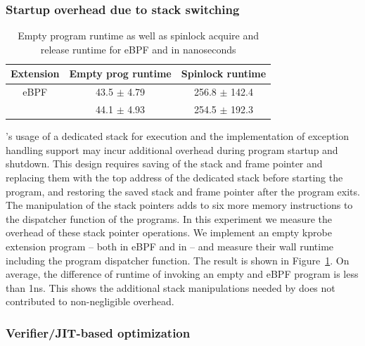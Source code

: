 \subsubsection{Startup overhead due to stack switching}
\begin{table}[t]
    \small
    \centering
    \begin{tabular}{ccc}%
        \toprule
        \textbf{Extension} & \textbf{Empty prog runtime} & \textbf{Spinlock runtime} \\
        \midrule
        eBPF & 43.5 $\pm$ 4.79 & 256.8 $\pm$ 142.4\\
        \projname{} & 44.1 $\pm$ 4.93 & 254.5 $\pm$ 192.3\\
        \bottomrule
    \end{tabular}
    \caption{Empty program runtime as well as spinlock acquire and release
        runtime for eBPF and \projname{} in nanoseconds}
    \vspace{-10pt}
    \label{tab:startup-cleanup}
\end{table}

\projname{}'s usage of a dedicated stack for execution and the implementation
    of exception handling support may incur additional overhead during program
    startup and shutdown.
This design requires saving of the stack and frame pointer and replacing them
    with the top address of the dedicated stack before starting the program,
    and restoring the saved stack and frame pointer after the program exits.
The manipulation of the stack pointers adds to six more memory instructions to
    the dispatcher function of the \projname{} programs.
In this experiment we measure the overhead of these stack pointer operations.
We implement an empty kprobe extension program -- both in eBPF and in
    \projname{} -- and measure their wall runtime including the program
    dispatcher function.
The result is shown in Figure~\ref{tab:startup-cleanup}.
On average, the difference of runtime of invoking an empty \projname{} and eBPF
    program is less than 1ns.
This shows the additional stack manipulations needed by \projname{} does not
    contributed to non-negligible overhead.

\subsubsection{Verifier/JIT-based optimization}
\label{eval:inline}


